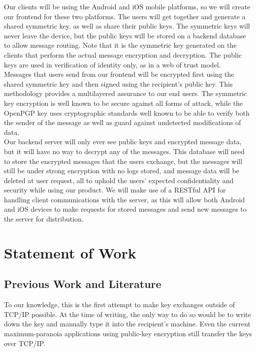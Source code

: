 \documentclass[11pt]{article}
\begin{document}
Our clients will be using the Android and iOS mobile platforms, so we will create our frontend for these two platforms. The users will get together and generate a shared symmetric key, as well as share their public keys. The symmetric keys will never leave the device, but the public keys will be stored on a backend database to allow message routing. Note that it is the symmetric key generated on the clients that perform the actual message encryption and decryption. The public keys are used in verification of identity only, as in a web of trust model. \\

Messages that users send from our frontend will be encrypted first using the shared symmetric key and then signed using the recipient’s public key. This methodology provides a multilayered assurance to our end users. The symmetric key encryption is well known to be secure against all forms of attack, while the OpenPGP key uses cryptographic standards well known to be able to verify both the sender of the message as well as guard against undetected modifications of data. \\

Our backend server will only ever see public keys and encrypted message data, but it will have no way to decrypt any of the messages. This database will need to store the encrypted messages that the users exchange, but the messages will still be under strong encryption with no logs stored, and message data will be deleted at user request, all to uphold the users’ expected confidentiality and security while using our product. We will make use of a RESTful API for handling client communications with the server, as this will allow both Android and iOS devices to make requests for stored messages and send new messages to the server for distribution.



\newpage
\section{Statement of Work}
\subsection{Previous Work and Literature}
To our knowledge, this is the first attempt to make key exchanges outside of TCP/IP possible. At the time of writing, the only way to do so would be to write down the key and manually type it into the recipient’s machine. Even the current maximum-paranoia applications using public-key encryption still transfer the keys over TCP/IP. \\
\end{document}
